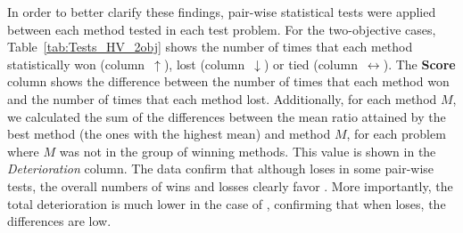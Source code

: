 In order to better clarify these findings, pair-wise statistical tests were applied between each method tested in each test problem.
%
For the two-objective cases, Table~\ref{tab:Tests_HV_2obj} shows the number of times that each method statistically won 
(column~$\uparrow$), lost (column~$\downarrow$) or tied (column~$\leftrightarrow$).
%
The \textbf{Score} column shows the difference between the number of times that each method won and the number of times that each 
method lost.
%
Additionally, for each method $M$, we calculated the sum of the differences between the mean \HV{} ratio attained by the best method 
(the ones with the highest mean) and method $M$, for each problem where $M$ was not in the group of winning methods.
%
This value is shown in the \textit{Deterioration} column.
%
The data confirm that although \AVSDMOEAD{} loses in some pair-wise tests, the overall numbers of wins and 
losses clearly favor \AVSDMOEAD{}.
%
More importantly, the total deterioration is much lower in the case of \AVSDMOEAD{}, confirming that when \AVSDMOEAD{} loses, 
the differences are low.





